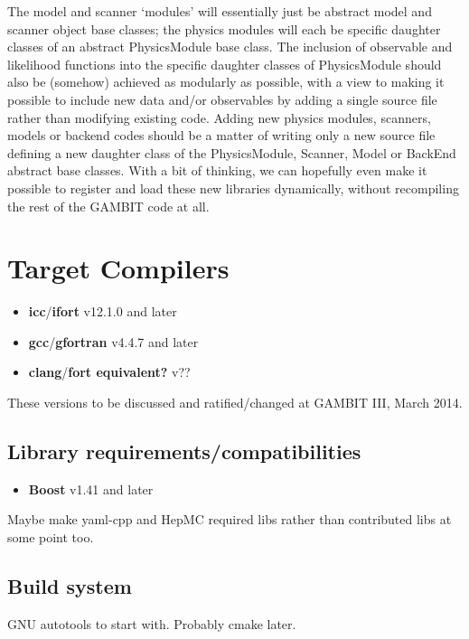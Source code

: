 The model and scanner `modules' will essentially just be abstract model and scanner object base classes; the physics modules will each be specific daughter classes of an abstract PhysicsModule base class.  The inclusion of observable and likelihood functions into the specific daughter classes of PhysicsModule should also be (somehow) achieved as modularly as possible, with a view to making it possible to include new data and/or observables by adding a single source file rather than modifying existing code.  Adding new physics modules, scanners, models or backend codes should be a matter of writing only a new source file defining a new daughter class of the PhysicsModule, Scanner, Model or BackEnd abstract base classes.  With a bit of thinking, we can hopefully even make it possible to register and load these new libraries dynamically, without recompiling the rest of the GAMBIT code at all.

\section{Target Compilers}

\begin{itemize}
\item[]\textbf{icc}/\textbf{ifort} v12.1.0 and later
\item[]\textbf{gcc}/\textbf{gfortran} v4.4.7 and later
\item[]\textbf{clang}/\textbf{fort equivalent?} v??
\end{itemize}

These versions to be discussed and ratified/changed at GAMBIT III, March 2014.

\subsection{Library requirements/compatibilities}

\begin{itemize}
\item[]\textbf{Boost} v1.41 and later
\end{itemize}

Maybe make yaml-cpp and HepMC required libs rather than contributed libs at some point too.

\subsection{Build system}

GNU autotools to start with.  Probably cmake later.


